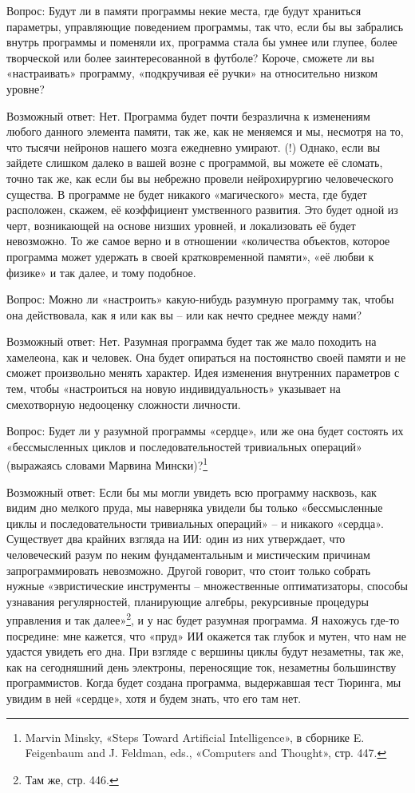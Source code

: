 \documentclass[../main.tex]{subfiles}
\begin{document}
Вопрос: Будут ли в памяти программы некие места, где будут храниться параметры, управляющие поведением программы, так что, если бы вы забрались внутрь программы и поменяли их, программа стала бы умнее или глупее, более творческой или более заинтересованной в футболе? Короче, сможете ли вы «настраивать» программу, «подкручивая её ручки» на относительно низком уровне?

Возможный ответ: Нет. Программа будет почти безразлична к изменениям любого данного элемента памяти, так же, как не меняемся и мы, несмотря на то, что тысячи нейронов нашего мозга ежедневно умирают. (!) Однако, если вы зайдете слишком далеко в вашей возне с программой, вы можете её сломать, точно так же, как если бы вы небрежно провели нейрохирургию человеческого существа. В программе не будет никакого «магического» места, где будет расположен, скажем, её коэффициент умственного развития. Это будет одной из черт, возникающей на основе низших уровней, и локализовать её будет невозможно. То же самое верно и в отношении «количества объектов, которое программа может удержать в своей кратковременной памяти», «её любви к физике» и так далее, и тому подобное.

Вопрос: Можно ли «настроить» какую-нибудь разумную программу так, чтобы она действовала, как я или как вы \--- или как нечто среднее между нами?

Возможный ответ: Нет. Разумная программа будет так же мало походить на хамелеона, как и человек. Она будет опираться на постоянство своей памяти и не сможет произвольно менять характер. Идея изменения внутренних параметров с тем, чтобы «настроиться на новую индивидуальность» указывает на смехотворную недооценку сложности личности.

Вопрос: Будет ли у разумной программы «сердце», или же она будет состоять их «бессмысленных циклов и последовательностей тривиальных операций» (выражаясь словами Марвина Мински)?\footnote{Marvin Minsky, «Steps Toward Artificial Intelligence», в сборнике E. Feigenbaum and J. Feldman, eds., «Computers and Thought», стр. 447.}

Возможный ответ: Если бы мы могли увидеть всю программу насквозь, как видим дно мелкого пруда, мы наверняка увидели бы только «бессмысленные циклы и последовательности тривиальных операций» \--- и никакого «сердца». Существует два крайних взгляда на ИИ: один из них утверждает, что человеческий разум по неким фундаментальным и мистическим причинам запрограммировать невозможно. Другой говорит, что стоит только собрать нужные «эвристические инструменты \--- множественные оптиматизаторы, способы узнавания регулярностей, планирующие алгебры, рекурсивные процедуры управления и так далее»\footnote{Там же, стр. 446.}, и у нас будет разумная программа. Я нахожусь где-то посредине: мне кажется, что «пруд» ИИ окажется так глубок и мутен, что нам не удастся увидеть его дна. При взгляде с вершины циклы будут незаметны, так же, как на сегодняшний день электроны, переносящие ток, незаметны большинству программистов. Когда будет создана программа, выдержавшая тест Тюринга, мы увидим в ней «сердце», хотя и будем знать, что его там нет.
\end{document}
